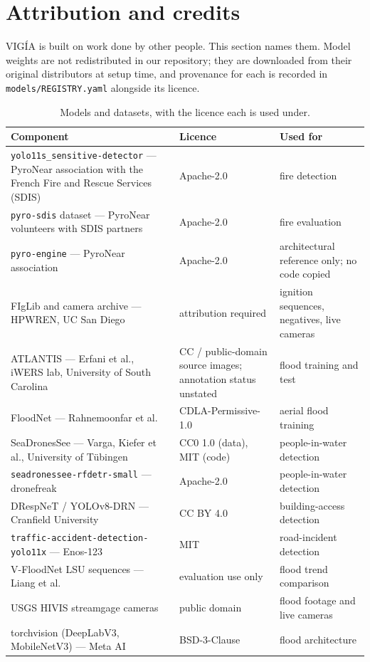 \section{Attribution and credits}
\label{sec:attribution}

VIGÍA is built on work done by other people. This section names them. Model
weights are not redistributed in our repository; they are downloaded from
their original distributors at setup time, and provenance for each is recorded
in \texttt{models/REGISTRY.yaml} alongside its licence.

\begin{table}[htbp]
\centering\small
\caption{Models and datasets, with the licence each is used under.}
\label{tab:credits}
\begin{tabularx}{\textwidth}{W{1.35} W{0.75} W{0.90}}
\toprule
Component & Licence & Used for \\
\midrule
\texttt{yolo11s\_sensitive-detector} — PyroNear association with the French Fire and Rescue Services (SDIS) & Apache-2.0 & fire detection \\
\texttt{pyro-sdis} dataset — PyroNear volunteers with SDIS partners & Apache-2.0 & fire evaluation \\
\texttt{pyro-engine} — PyroNear association & Apache-2.0 & architectural reference only; no code copied \\
FIgLib and camera archive — HPWREN, UC San Diego & attribution required & ignition sequences, negatives, live cameras \\
ATLANTIS — Erfani et al., iWERS lab, University of South Carolina & CC / public-domain source images; annotation status unstated & flood training and test \\
FloodNet — Rahnemoonfar et al. & CDLA-Permissive-1.0 & aerial flood training \\
SeaDronesSee — Varga, Kiefer et al., University of Tübingen & CC0 1.0 (data), MIT (code) & people-in-water detection \\
\texttt{seadronessee-rfdetr-small} — dronefreak & Apache-2.0 & people-in-water detection \\
DRespNeT / YOLOv8-DRN — Cranfield University & CC BY 4.0 & building-access detection \\
\texttt{traffic-accident-detection-yolo11x} — Enos-123 & MIT & road-incident detection \\
V-FloodNet LSU sequences — Liang et al. & evaluation use only & flood trend comparison \\
USGS HIVIS streamgage cameras & public domain & flood footage and live cameras \\
torchvision (DeepLabV3, MobileNetV3) — Meta AI & BSD-3-Clause & flood architecture \\
\bottomrule
\end{tabularx}
\end{table}


